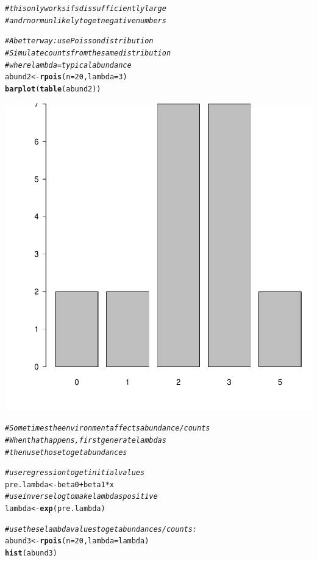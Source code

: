 \documentclass{article}\usepackage[]{graphicx}\usepackage[]{color}
\makeatletter
\newcommand{\hlnum}[1]{\textcolor[rgb]{0.686,0.059,0.569}{#1}}%
\newcommand{\hlcom}[1]{\textcolor[rgb]{0.678,0.584,0.686}{\textit{#1}}}%
\newcommand{\hlopt}[1]{\textcolor[rgb]{0,0,0}{#1}}%
\newcommand{\hlstd}[1]{\textcolor[rgb]{0.345,0.345,0.345}{#1}}%
\newcommand{\hlkwb}[1]{\textcolor[rgb]{0.69,0.353,0.396}{#1}}%
\newcommand{\hlkwc}[1]{\textcolor[rgb]{0.333,0.667,0.333}{#1}}%
\newcommand{\hlkwd}[1]{\textcolor[rgb]{0.737,0.353,0.396}{\textbf{#1}}}%
\newenvironment{kframe}{%
 \def\at@end@of@kframe{}%
 \ifinner\ifhmode%
  \def\at@end@of@kframe{\end{minipage}}%
  \begin{minipage}{\columnwidth}%
 \fi\fi%
 \def\FrameCommand##1{\hskip\@totalleftmargin \hskip-\fboxsep
 \colorbox{shadecolor}{##1}\hskip-\fboxsep
     \hskip-\linewidth \hskip-\@totalleftmargin \hskip\columnwidth}%
 \MakeFramed {\advance\hsize-\width
   \@totalleftmargin\z@ \linewidth\hsize
   \@setminipage}}%
 {\par\unskip\endMakeFramed%
 \at@end@of@kframe}
\newenvironment{knitrout}{}{} %
\makeatother
\begin{document}
\begin{knitrout}
{}


\begin{kframe}\begin{alltt}
\hlcom{# this only works if sd is sufficiently large }
\hlcom{# and rnorm unlikely to get negative numbers}

\hlcom{# A better way: use Poisson distribution}
\hlcom{# Simulate counts from the same distribution}
\hlcom{# where lambda = typical abundance}
\hlstd{abund2} \hlkwb{<-} \hlkwd{rpois}\hlstd{(}\hlkwc{n} \hlstd{=} \hlnum{20}\hlstd{,} \hlkwc{lambda} \hlstd{=} \hlnum{3}\hlstd{)}
\hlkwd{barplot}\hlstd{(}\hlkwd{table}\hlstd{(abund2))}
\end{alltt}
\end{kframe}

{\centering \includegraphics[width=.6\linewidth]{figure/Tutorial08-datasims-S2022-Rnwauto-report-7} 

}


\begin{kframe}\begin{alltt}
\hlcom{# Sometimes the environment affects abundance/counts}
\hlcom{# When that happens, first generate lambdas}
\hlcom{# then use those to get abundances}

\hlcom{# use regression to get initial values}
\hlstd{pre.lambda} \hlkwb{<-} \hlstd{beta0}\hlopt{+}\hlstd{beta1}\hlopt{*}\hlstd{x}
\hlcom{# use inverse log to make lambdas positive}
\hlstd{lambda} \hlkwb{<-} \hlkwd{exp}\hlstd{(pre.lambda)}

\hlcom{# use these lambda values to get abundances/counts:}
\hlstd{abund3} \hlkwb{<-} \hlkwd{rpois}\hlstd{(}\hlkwc{n} \hlstd{=} \hlnum{20}\hlstd{,} \hlkwc{lambda} \hlstd{= lambda)}
\hlkwd{hist}\hlstd{(abund3)}
\end{alltt}
\end{kframe}


\end{knitrout}
\end{document}
